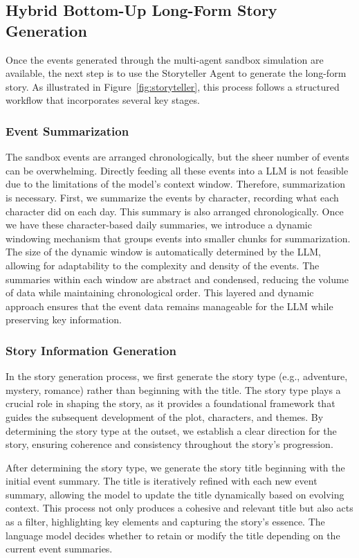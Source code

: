 \documentclass[letterpaper]{article} %
\begin{document}
\subsection{Hybrid Bottom-Up Long-Form Story Generation}

Once the events generated through the multi-agent sandbox simulation are available, the next step is to use the Storyteller Agent to generate the long-form story. As illustrated in Figure~\ref{fig:storyteller}, this process follows a structured workflow that incorporates several key stages.

\subsubsection{Event Summarization}

The sandbox events are arranged chronologically, but the sheer number of events can be overwhelming. Directly feeding all these events into a LLM is not feasible due to the limitations of the model's context window. Therefore, summarization is necessary. First, we summarize the events by character, recording what each character did on each day. This summary is also arranged chronologically. Once we have these character-based daily summaries, we introduce a dynamic windowing mechanism that groups events into smaller chunks for summarization. The size of the dynamic window is automatically determined by the LLM, allowing for adaptability to the complexity and density of the events. The summaries within each window are abstract and condensed, reducing the volume of data while maintaining chronological order. This layered and dynamic approach ensures that the event data remains manageable for the LLM while preserving key information.

\subsubsection{Story Information Generation}

In the story generation process, we first generate the story type (e.g., adventure, mystery, romance) rather than beginning with the title. The story type plays a crucial role in shaping the story, as it provides a foundational framework that guides the subsequent development of the plot, characters, and themes. By determining the story type at the outset, we establish a clear direction for the story, ensuring coherence and consistency throughout the story's progression.

After determining the story type, we generate the story title beginning with the initial event summary. The title is iteratively refined with each new event summary, allowing the model to update the title dynamically based on evolving context. This process not only produces a cohesive and relevant title but also acts as a filter, highlighting key elements and capturing the story's essence. The language model decides whether to retain or modify the title depending on the current event summaries.
\end{document}
